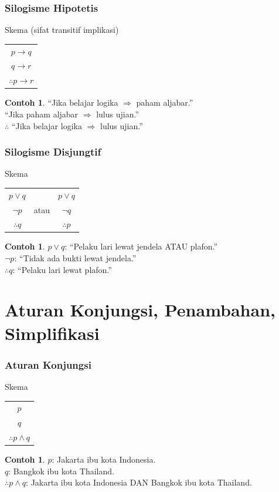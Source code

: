 \documentclass[handout]{beamer}
\theoremstyle{definition}
\theoremstyle{example}
\newtheorem{contoh}[theorem]{Contoh}
\begin{document}
\begin{frame}
\frametitle{Silogisme Hipotetis}
\begin{block}{Skema (sifat transitif implikasi)}
\begin{tabular}{c}
$p \rightarrow q$ \\
$q \rightarrow r$ \\
\hline
$\therefore p \rightarrow r$
\end{tabular}
\end{block}
\begin{contoh}
``Jika belajar logika $\Rightarrow$ paham aljabar.''\\
``Jika paham aljabar $\Rightarrow$ lulus ujian.''\\
$\therefore$ ``Jika belajar logika $\Rightarrow$ lulus ujian.''
\end{contoh}
\end{frame}

\begin{frame}
\frametitle{Silogisme Disjungtif}
\begin{block}{Skema}
\begin{tabular}{ccc}
$p \vee q$ & \quad & $p \vee q$ \\
$\neg p$ & atau & $\neg q$ \\
\hline
$\therefore q$ & & $\therefore p$
\end{tabular}
\end{block}
\begin{contoh}
$p \vee q$: ``Pelaku lari lewat jendela ATAU plafon.''\\
$\neg p$: ``Tidak ada bukti lewat jendela.''\\
$\therefore q$: ``Pelaku lari lewat plafon.''
\end{contoh}
\end{frame}

\section{Aturan Konjungsi, Penambahan, Simplifikasi}

\begin{frame}
\frametitle{Aturan Konjungsi}
\begin{block}{Skema}
\begin{tabular}{c}
$p$ \\
$q$ \\
\hline
$\therefore p \wedge q$
\end{tabular}
\end{block}
\begin{contoh}
$p$: Jakarta ibu kota Indonesia.\\
$q$: Bangkok ibu kota Thailand.\\
$\therefore p \wedge q$: Jakarta ibu kota Indonesia DAN Bangkok ibu kota Thailand.
\end{contoh}
\end{frame}
\end{document}
